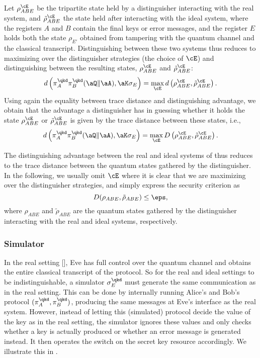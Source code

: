   Let $\rho^{\cE}_{ABE}$ be the tripartite state held by a
  distinguisher interacting with the real system, and
  $\tilde{\rho}^{\cE}_{ABE}$ the state held after interacting with the
  ideal system, where the registers $A$ and $B$ contain the final keys
  or error messages, and the register $E$ holds both the state
  $\rho_{E'}$ obtained from tampering with the quantum channel and the
  classical transcript. Distinguishing between these two systems thus
  reduces to maximizing over the distinguisher strategies (the choice
  of $\cE$) and distinguishing between the resulting states,
  $\rho^{\cE}_{ABE}$ and $\tilde{\rho}^{\cE}_{ABE}$:
\[ 
d\left( \pi_A^{\qkd}\pi_B^{\qkd}(\aQ \| \aA) , \aK \sigma_E \right)
= \max_{\cE} d\left( \rho^{\cE}_{ABE},\tilde{\rho}^{\cE}_{ABE} \right).
 \]
 Using again the equality between trace distance and distinguishing
 advantage, we obtain that the advantage a distinguisher has in
 guessing whether it holds the state $\rho^{\cE}_{ABE}$ or
 $\tilde{\rho}^{\cE}_{ABE}$ is given by the trace distance between
 these states, i.e.,
\[ 
  d\left( \pi_A^{\qkd}\pi_B^{\qkd}(\aQ \| \aA) , \aK \sigma_E \right)
= \max_{\cE} D\left(\rho^{\cE}_{ABE},\tilde{\rho}^{\cE}_{ABE} \right). 
\]

The distinguishing advantage between the real and ideal systems of
 thus reduces to the trace distance between
the quantum states gathered by the distinguisher. In the following, we
usually omit ${\cE}$ where it is clear that we are maximizing over the
distinguisher strategies, and simply express the security criterion
as \begin{equation} \label{eq:qkd.security.1}
  D(\rho_{ABE},\tilde{\rho}_{ABE}) \leq \eps, \end{equation} where
$\rho_{ABE}$ and $\tilde{\rho}_{ABE}$ are the quantum states gathered
by the distinguisher interacting with the real and ideal systems,
respectively.


\subsubsection{Simulator}
\label{sec:security.simulator}

In the real setting [], Eve has full control
over the quantum channel and obtains the entire classical transcript
of the protocol. So for the real and ideal settings to be
indistinguishable, a simulator $\sigma^{\qkd}_E$ must generate the
same communication as in the real setting. This can be done by
internally running Alice's and Bob's protocol
$(\pi^{\qkd}_A,\pi^{\qkd}_B)$, producing the same messages at Eve's
interface as the real system. However, instead of letting this
(simulated) protocol decide the value of the key as in the real
setting, the simulator ignores these values and only checks whether a
key is actually produced or whether an error message is generated
instead. It then operates the switch on the secret key resource
accordingly. We illustrate this in .

